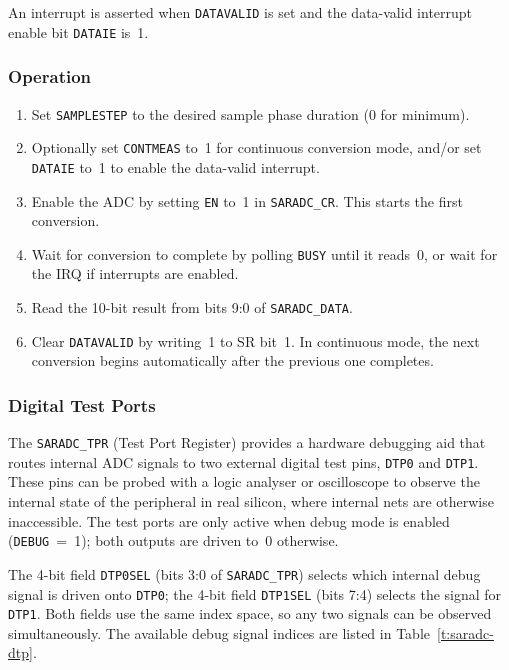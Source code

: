 An interrupt is asserted when \texttt{DATAVALID} is set and the data-valid interrupt enable bit \texttt{DATAIE} is~1.

\subsubsection*{Operation}

\begin{enumerate}
    \item Set \texttt{SAMPLESTEP} to the desired sample phase duration (0 for minimum).
    \item Optionally set \texttt{CONTMEAS} to~1 for continuous conversion mode, and/or set \texttt{DATAIE} to~1 to enable the data-valid interrupt.
    \item Enable the ADC by setting \texttt{EN} to~1 in \texttt{SARADC\_CR}. This starts the first conversion.
    \item Wait for conversion to complete by polling \texttt{BUSY} until it reads~0, or wait for the IRQ if interrupts are enabled.
    \item Read the 10-bit result from bits 9:0 of \texttt{SARADC\_DATA}.
    \item Clear \texttt{DATAVALID} by writing~1 to SR bit~1. In continuous mode, the next conversion begins automatically after the previous one completes.
\end{enumerate}

\subsubsection*{Digital Test Ports}

The \texttt{SARADC\_TPR} (Test Port Register) provides a hardware debugging aid that routes internal ADC signals to two external digital test pins, \texttt{DTP0} and \texttt{DTP1}. These pins can be probed with a logic analyser or oscilloscope to observe the internal state of the peripheral in real silicon, where internal nets are otherwise inaccessible. The test ports are only active when debug mode is enabled (\texttt{DEBUG}~=~1); both outputs are driven to~0 otherwise.

The 4-bit field \texttt{DTP0SEL} (bits 3:0 of \texttt{SARADC\_TPR}) selects which internal debug signal is driven onto \texttt{DTP0}; the 4-bit field \texttt{DTP1SEL} (bits 7:4) selects the signal for \texttt{DTP1}. Both fields use the same index space, so any two signals can be observed simultaneously. The available debug signal indices are listed in Table~\ref{t:saradc-dtp}.

